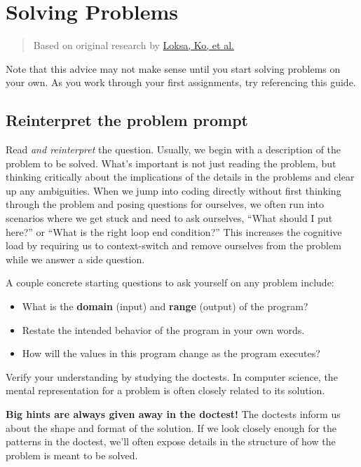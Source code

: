 \section*{Solving Problems}

\begin{quote} Based on original research by
\href{http://dx.doi.org/10.1145/2858036.2858252}{Loksa, Ko, et al.}
\end{quote}

Note that this advice may not make sense until you start solving problems on 
your own. As you work through your first assignments, try referencing
this guide.

\subsection*{Reinterpret the problem prompt}

Read \emph{and reinterpret} the question. Usually, we begin with a description
of the problem to be solved. What's important is not just reading the problem,
but thinking critically about the implications of the details in the problems
and clear up any ambiguities. When we jump into coding directly without first
thinking through the problem and posing questions for ourselves, we often run
into scenarios where we get stuck and need to ask ourselves, ``What should I
put here?'' or ``What is the right loop end condition?'' This increases the
cognitive load by requiring us to context-switch and remove ourselves from the
problem while we answer a side question.

A couple concrete starting questions to ask yourself on any problem include:

\begin{itemize}
\item What is the \textbf{domain} (input) and \textbf{range} (output) of the
program?
\item Restate the intended behavior of the program in your own words.
\item How will the values in this program change as the program executes?
\end{itemize}

Verify your understanding by studying the doctests. In computer science, the
mental representation for a problem is often closely related to its solution.

\textbf{Big hints are always given away in the doctest!} The doctests inform us
about the shape and format of the solution. If we look closely enough for the
patterns in the doctest, we'll often expose details in the structure of how the
problem is meant to be solved.

